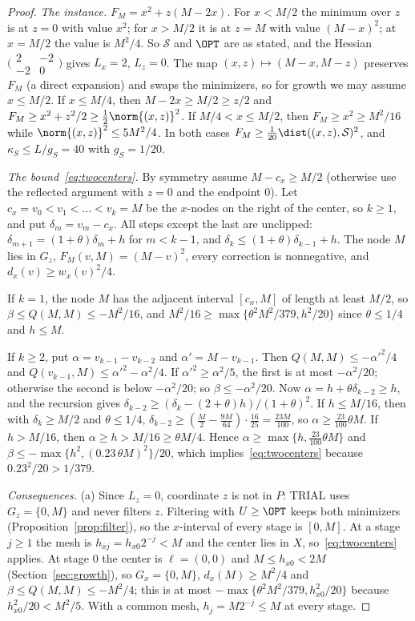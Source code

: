 \begin{proof}
\emph{The instance.} $F_M=x^2+z(M-2x)$. For $x<M/2$ the minimum over $z$ is
at $z=0$ with value $x^2$; for $x>M/2$ it is at $z=M$ with value $(M-x)^2$;
at $x=M/2$ the value is $M^2/4$. So $\mathcal S$ and $\OPT$ are as stated,
and the Hessian $\bigl(\begin{smallmatrix}2&-2\\-2&0\end{smallmatrix}\bigr)$
gives $L_x=2$, $L_z=0$. The map $(x,z)\mapsto(M-x,M-z)$ preserves $F_M$ (a
direct expansion) and swaps the minimizers, so for growth we may assume
$x\le M/2$. If $x\le M/4$, then $M-2x\ge M/2\ge z/2$ and
$F_M\ge x^2+z^2/2\ge\frac12\norm{(x,z)}^2$. If $M/4<x\le M/2$, then
$F_M\ge x^2\ge M^2/16$ while $\norm{(x,z)}^2\le5M^2/4$. In both cases
$F_M\ge\frac1{20}\dist((x,z),\mathcal S)^2$, and
$\kappa_S\le L/g_S=40$ with $g_S=1/20$.

\emph{The bound~\eqref{eq:twocenters}.} By symmetry assume $M-c_x\ge M/2$
(otherwise use the reflected argument with $z=0$ and the endpoint $0$). Let
$c_x=v_0<v_1<\dots<v_k=M$ be the $x$-nodes on the right of the center, so
$k\ge1$, and put $\delta_m=v_m-c_x$. All steps except the last are unclipped:
$\delta_{m+1}=(1+\theta)\delta_m+h$ for $m<k-1$, and
$\delta_k\le(1+\theta)\delta_{k-1}+h$. The node $M$ lies in $G_z$,
$F_M(v,M)=(M-v)^2$, every correction is nonnegative, and
$d_x(v)\ge w_x(v)^2/4$.

If $k=1$, the node $M$ has the adjacent interval $[c_x,M]$ of length at least
$M/2$, so $\beta\le Q(M,M)\le-M^2/16$, and
$M^2/16\ge\max\{\theta^2M^2/379,h^2/20\}$ since $\theta\le1/4$ and $h\le M$.

If $k\ge2$, put $\alpha=v_{k-1}-v_{k-2}$ and $\alpha'=M-v_{k-1}$. Then
$Q(M,M)\le-\alpha'^2/4$ and $Q(v_{k-1},M)\le\alpha'^2-\alpha^2/4$. If
$\alpha'^2\ge\alpha^2/5$, the first is at most $-\alpha^2/20$; otherwise the
second is below $-\alpha^2/20$; so $\beta\le-\alpha^2/20$. Now
$\alpha=h+\theta\delta_{k-2}\ge h$, and the recursion gives
$\delta_{k-2}\ge(\delta_k-(2+\theta)h)/(1+\theta)^2$. If $h\le M/16$, then
with $\delta_k\ge M/2$ and $\theta\le1/4$,
$\delta_{k-2}\ge(\frac M2-\frac{9M}{64})\cdot\frac{16}{25}=\frac{23M}{100}$, so
$\alpha\ge\frac{23}{100}\theta M$. If $h>M/16$, then
$\alpha\ge h>M/16\ge\theta M/4$. Hence $\alpha\ge\max\{h,\frac{23}{100}\theta M\}$
and $\beta\le-\max\{h^2,(0.23\,\theta M)^2\}/20$, which
implies~\eqref{eq:twocenters} because $0.23^2/20>1/379$.

\emph{Consequences.} (a) Since $L_z=0$, coordinate $z$ is not in $P$: TRIAL
uses $G_z=\{0,M\}$ and never filters $z$. Filtering with $U\ge\OPT$ keeps
both minimizers (Proposition~\ref{prop:filter}), so the $x$-interval of every
stage is $[0,M]$. At a stage $j\ge1$ the mesh is $h_{xj}=h_{x0}2^{-j}<M$ and
the center lies in $X$, so~\eqref{eq:twocenters} applies. At stage $0$ the
center is $\ell=(0,0)$ and $M\le h_{x0}<2M$ (Section~\ref{sec:growth}), so
$G_x=\{0,M\}$, $d_x(M)\ge M^2/4$ and $\beta\le Q(M,M)\le-M^2/4$; this is at
most $-\max\{\theta^2M^2/379,h_{x0}^2/20\}$ because $h_{x0}^2/20<M^2/5$.
With a common mesh, $h_j=M2^{-j}\le M$ at every stage.


\end{proof}
